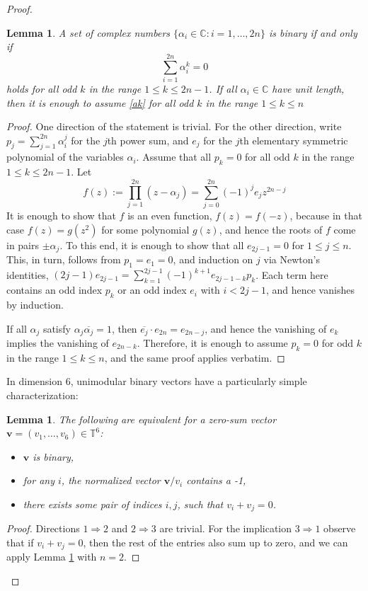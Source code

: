 \documentclass[12pt]{amsart}
\numberwithin{equation}{section}
\newcommand{\stb}{,\ldots,}
\newcommand{\then}{\Rightarrow}
\newcommand*\conj[1]{\overline{#1}}
\newcommand{\al}{\alpha}
\newcommand{\C}{\mathbb{C}}
\newtheorem{lemma}[fact]{Lemma}
\theoremstyle{definition}
\theoremstyle{remark}
\theoremstyle{remark}
\newcommand{\TT}{\ensuremath{\mathbb{T}}}
\def \C {\mathbb{C}}
\newcommand{\vb}{\ensuremath{\mathbf{v}}}
\begin{document}
\begin{proof}
\begin{lemma}\label{lemma:cancellation}
	A set of complex numbers $\{\al_i\in \C: i=1\stb 2n\}$ is binary if and only if 
\begin{equation}\label{ak}
\sum_{i=1}^{2n} \al_i^k=0
\end{equation}
holds for all odd $k$ in the range $1\leq k \leq 2n-1$. If all $\al_i\in \C$ have unit length, then it is enough to assume \eqref{ak} for all odd $k$ in the range  $1\le k\le n$ \end{lemma}
\begin{proof}
One direction of the statement is trivial. For the other direction, write $p_j=\sum_{j=1}^{2n} \alpha_i^j$ for the $j$th power sum, and $e_j$ for the $j$th elementary symmetric polynomial of the variables $\al_i$. 
Assume that all $p_k=0$ for all odd $k$ in the range $1\le k\le 2n-1$. 
Let \[f(z):=\prod_{j=1}^{2n}(z-\al_j)=\sum_{j=0}^{2n} (-1)^je_jz^{2n-j}\]
It is enough to show that $f$ is an even function, $f(z)=f(-z)$, because in that case $f(z)=g(z^2)$ for some polynomial $g(z)$, and hence the roots of $f$ come in pairs $\pm \alpha_j$. To this end, it is enough to show that all $e_{2j-1}=0$ for $1\le j\le n$. This, in turn, follows from $p_1=e_1=0$, and  induction on $j$ via Newton's identities,
$(2j-1)e_{2j-1}=\sum_{k=1}^{2j-1} (-1)^{k+1} e_{2j-1-k}p_k$. Each term here contains an odd index $p_k$ or an odd index $e_i$ with $i<2j-1$, and hence vanishes by induction. 

 \medskip
 
If all $\al_j$ satisfy $\al_j\conj{\al_j}=1$, then $\conj{e_j}\cdot e_{2n}=e_{2n-j}$, and hence the vanishing of $e_k$ implies the vanishing of $e_{2n-k}$. Therefore, it is enough to assume $p_k=0$ for odd $k$ in the range $1\le k\le n$, and the same proof applies verbatim.
\end{proof}

In dimension 6, unimodular binary vectors have a particularly simple characterization:
\begin{lemma}\label{lemma:cancellingvector}
	The following are equivalent for a zero-sum vector $\vb=(v_1, \dots, v_6) \in \TT^{6}$:
	\begin{itemize}
		\item[1)]  $\vb$ is binary,
		\item[2)] for any $i$, the normalized vector $\vb/v_i$ contains a -1,
		\item[3)] there exists some pair of indices $i,j$, such that $v_i+v_j=0$.
	\end{itemize}
\end{lemma}
\begin{proof}
	Directions $1\then 2$ and $2\then 3$ are trivial. For the implication  $3\then 1$ observe that if $v_i+v_j=0$, then the rest of the entries also sum up to zero, and we can apply Lemma \ref{lemma:cancellation} with $n=2$. 
\end{proof}



\end{proof}
\end{document}
